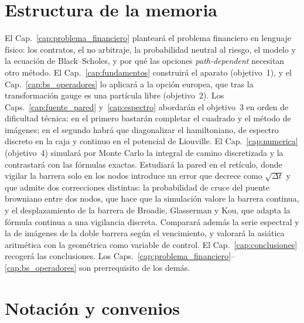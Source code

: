 \section{Estructura de la memoria}
\label{sec:estructura_memoria}

El Cap.~\ref{cap:problema_financiero} planteará el problema financiero
en lenguaje físico: los contratos, el no arbitraje, la probabilidad
neutral al riesgo, el modelo y la ecuación de Black--Scholes, y por qué
las opciones \emph{path-dependent} necesitan otro método. El
Cap.~\ref{cap:fundamentos} construirá el aparato (objetivo~1), y el
Cap.~\ref{cap:bs_operadores} lo aplicará a la opción europea, que tras
la transformación gauge es una partícula libre (objetivo~2). Los
Caps.~\ref{cap:fuente_pared} y~\ref{cap:espectro} abordarán el
objetivo~3 en orden de dificultad técnica: en el primero bastarán
completar el cuadrado y el método de imágenes; en el segundo habrá que
diagonalizar el hamiltoniano, de espectro discreto en la caja y continuo
en el potencial de Liouville. El Cap.~\ref{cap:numerica} (objetivo~4)
simulará por Monte Carlo la integral de camino discretizada y la
contrastará con las fórmulas exactas. Estudiará la pared en el retículo,
donde vigilar la barrera solo en los nodos introduce un error que
decrece como $\sqrt{\Delta t}$ y que admite dos correcciones distintas:
la probabilidad de cruce del puente browniano entre dos nodos, que hace
que la simulación valore la barrera continua, y el desplazamiento de la
barrera de Broadie, Glasserman y Kou, que adapta la fórmula continua a
una vigilancia discreta. Comparará además la serie espectral y la de
imágenes de la doble barrera según el vencimiento, y valorará la
asiática aritmética con la geométrica como variable de control. El
Cap.~\ref{cap:conclusiones} recogerá las conclusiones. Los
Caps.~\ref{cap:problema_financiero}--\ref{cap:bs_operadores} son
prerrequisito de los demás.

\section{Notación y convenios}
\label{sec:notacion_convenios}

